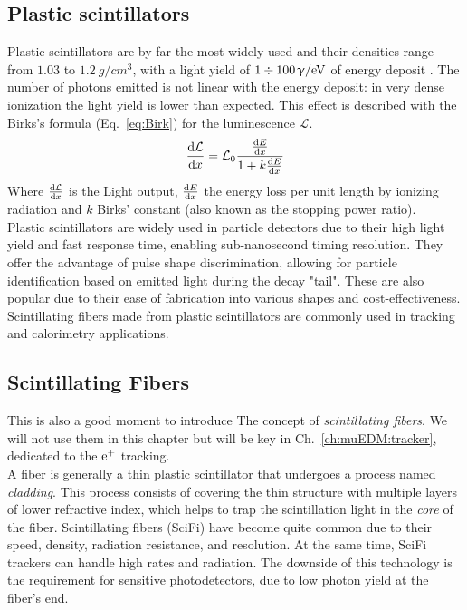 \begin{refsection}
    \subsection{Plastic scintillators}
        Plastic scintillators are by far the most widely used and their densities range from $1.03$ to $\SI{1.2}{g\per cm^3}$, with a light yield of $1\divisionsymbol\SI{100}{\upgamma/eV}$ of energy deposit \cite{PDG}.
        The number of photons emitted is not linear with the energy deposit: in very dense ionization the light yield is lower than expected.
        This effect is described with the Birks's formula (Eq.~\ref{eq:Birk}) for the luminescence $\mathcal{L}$.
        \begin{equation}
            \dv{\mathcal{L}}{x} = \mathcal{L}_0 \frac{\dv{E}{x}}{1 + k \dv{E}{x}}
            \label{eq:Birk}
        \end{equation}
        Where $\dv{\mathcal{L}}{x}$ is the Light output, $\dv{E}{x}$ the energy loss per unit length by ionizing radiation and $k$ Birks' constant (also known as the stopping power ratio).\\
        Plastic scintillators are widely used in particle detectors due to their high light yield and fast response time, enabling sub-nanosecond timing resolution. 
        They offer the advantage of pulse shape discrimination, allowing for particle identification based on emitted light during the decay "tail".
        These are also popular due to their ease of fabrication into various shapes and cost-effectiveness. 
        Scintillating fibers made from plastic scintillators are commonly used in tracking and calorimetry applications.

    \subsection{Scintillating Fibers}
        This is also a good moment to introduce The concept of \textit{scintillating fibers}.
        We will not use them in this chapter but will be key in Ch.~\ref{ch:muEDM:tracker}, dedicated to the $\text{e}^+$ tracking.\\
        A fiber is generally a thin plastic scintillator that undergoes a process named \textit{cladding}.
        This process consists of covering the thin structure with multiple layers of lower refractive index, which helps to trap the scintillation light in the \textit{core} of the fiber.
        Scintillating fibers (SciFi) have become quite common due to their speed, density, radiation resistance, and resolution. 
        At the same time, SciFi trackers can handle high rates and radiation. 
        The downside of this technology is the requirement for sensitive photodetectors, due to low photon yield at the fiber's end. 


\end{refsection}

